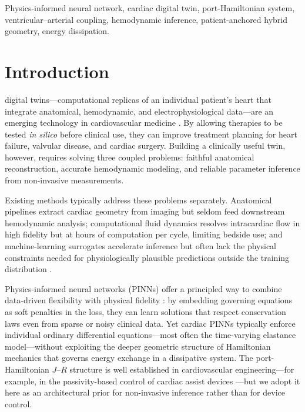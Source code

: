 \documentclass[journal]{IEEEtran}
\begin{document}
\begin{IEEEkeywords}
Physics-informed neural network, cardiac digital twin, port-Hamiltonian system, ventricular--arterial coupling, hemodynamic inference, patient-anchored hybrid geometry, energy dissipation.
\end{IEEEkeywords}

\section{Introduction}\label{sec:intro}
 digital twins---computational replicas of an individual patient's heart that integrate anatomical, hemodynamic, and electrophysiological data---are an emerging technology in cardiovascular medicine \cite{corral2020}. By allowing therapies to be tested \emph{in silico} before clinical use, they can improve treatment planning for heart failure, valvular disease, and cardiac surgery. Building a clinically useful twin, however, requires solving three coupled problems: faithful anatomical reconstruction, accurate hemodynamic modeling, and reliable parameter inference from non-invasive measurements.

Existing methods typically address these problems separately. Anatomical pipelines extract cardiac geometry from imaging but seldom feed downstream hemodynamic analysis; computational fluid dynamics resolves intracardiac flow in high fidelity but at hours of computation per cycle, limiting bedside use; and machine-learning surrogates accelerate inference but often lack the physical constraints needed for physiologically plausible predictions outside the training distribution \cite{greener2022}.

Physics-informed neural networks (PINNs) offer a principled way to combine data-driven flexibility with physical fidelity \cite{raissi2019}: by embedding governing equations as soft penalties in the loss, they can learn solutions that respect conservation laws even from sparse or noisy clinical data. Yet cardiac PINNs typically enforce individual ordinary differential equations---most often the time-varying elastance model---without exploiting the deeper geometric structure of Hamiltonian mechanics that governs energy exchange in a dissipative system. The port-Hamiltonian $J$--$R$ structure is well established in cardiovascular engineering---for example, in the passivity-based control of cardiac assist devices \cite{hammoud2026}---but we adopt it here as an architectural prior for non-invasive inference rather than for device control.
\end{document}
